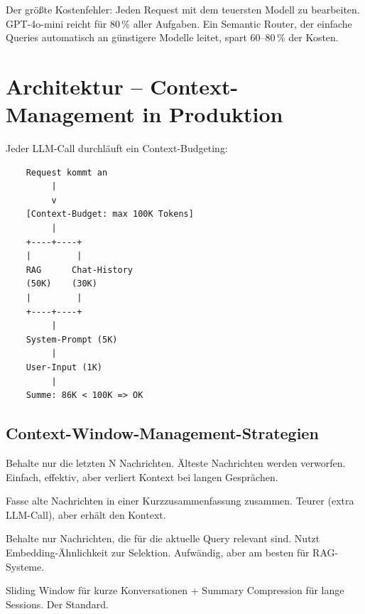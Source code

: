 \begin{praxishinweis}
Der größte Kostenfehler: Jeden Request mit dem teuersten Modell zu bearbeiten. GPT-4o-mini reicht für 80\,\% aller Aufgaben. Ein Semantic Router, der einfache Queries automatisch an günstigere Modelle leitet, spart 60--80\,\% der Kosten.
\end{praxishinweis}

\section{Architektur -- Context-Management in Produktion}

Jeder LLM-Call durchläuft ein Context-Budgeting:

\begin{verbatim}
    Request kommt an
         |
         v
    [Context-Budget: max 100K Tokens]
         |
    +----+----+
    |         |
    RAG      Chat-History
    (50K)    (30K)
    |         |
    +----+----+
         |
    System-Prompt (5K)
         |
    User-Input (1K)
         |
    Summe: 86K < 100K => OK
\end{verbatim}

\subsection{Context-Window-Management-Strategien}

\begin{description}[leftmargin=*,style=nextline]
    \item[Sliding Window] Behalte nur die letzten N Nachrichten.
    Älteste Nachrichten werden verworfen. Einfach, effektiv, aber
    verliert Kontext bei langen Gesprächen.

    \item[Summary Compression] Fasse alte Nachrichten in einer
    Kurzzusammenfassung zusammen. Teurer (extra LLM-Call), aber
    erhält den Kontext.

    \item[Semantic Filtering] Behalte nur Nachrichten, die für die
    aktuelle Query relevant sind. Nutzt Embedding-Ähnlichkeit zur
    Selektion. Aufwändig, aber am besten für RAG-Systeme.

    \item[Hybrid] Sliding Window für kurze Konversationen + Summary
    Compression für lange Sessions. Der Standard.
\end{description}

